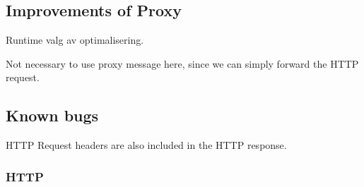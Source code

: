 \subsection{Improvements of Proxy}

Runtime valg av optimalisering.


Not necessary to use proxy message here, since we can simply forward the HTTP request.


\subsection{Known bugs}

HTTP Request headers are also included in the HTTP response.

\subsubsection{HTTP}
